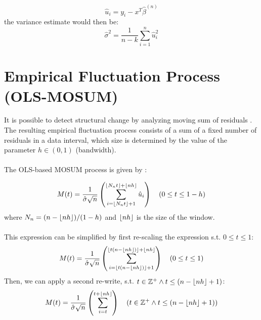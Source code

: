 \documentclass[main.tex]{subfiles}
\begin{document}
\begin{equation} \label{eq:residuals}
\hat{u}_i = y_i - x^T\hat{\beta}^{(n)}
\end{equation}
the variance estimate would then be:
\begin{equation} \label{eq:sigma}
\hat{\sigma}^{2}=\frac{1}{n-k} \sum_{i=1}^{n} \hat{u}_{i}^{2}
\end{equation}

\section{Empirical Fluctuation Process (OLS-MOSUM)}
\label{sec:empirical_fluctuation}
It is possible to detect structural change by analyzing moving sum of residuals
\cite{strucchange}. The resulting empirical fluctuation process consists of a
sum of a fixed number of residuals in a data interval, which size is determined
by the value of the parameter $h \in (0,1)$ (bandwidth). \\\\
The OLS-based MOSUM process is given by \cite{mosum_tests}:

\begin{equation}\label{eq:mosum_og}
M(t)=\frac{1}{\hat{\sigma} \sqrt{n}}
\left(\sum_{i=\lfloor N_{n} t\rfloor+1}^{\left\lfloor N_{n} t\right\rfloor+\lfloor
  n h\rfloor} \hat{u}_{i}\right) \quad(0 \leq t \leq 1-h)
\end{equation}
where $N_{n}=(n-\lfloor n h\rfloor) /(1-h)$ and $\lfloor n h\rfloor$ is the size of the
window. \\\\
This expression can be simplified by first re-scaling the
expression s.t. $0 \leq t \leq 1$:
\begin{equation}
  M(t) =
  \frac{1}{\hat{\sigma} \sqrt{n}}
  \left(\sum_{i=\lfloor t(n - \lfloor nh\rfloor)\rfloor + 1}^{\lfloor t(n - \lfloor nh\rfloor)\rfloor + \lfloor nh\rfloor}\right)
  \quad(0 \leq t \leq 1)
\end{equation}
Then, we can apply a second re-write, s.t.
$t \in \mathbb{Z}^+ \wedge t \leq (n - \lfloor nh\rfloor + 1)$:
\begin{equation} \label{eq:mosum}
  M(t) =
  \frac{1}{\hat{\sigma} \sqrt{n}}
  \left(\sum_{i=t}^{t + \lfloor nh\rfloor}\right)
  \quad(t \in \mathbb{Z}^+ \wedge t \leq (n - \lfloor nh\rfloor + 1))
\end{equation}
\end{document}
